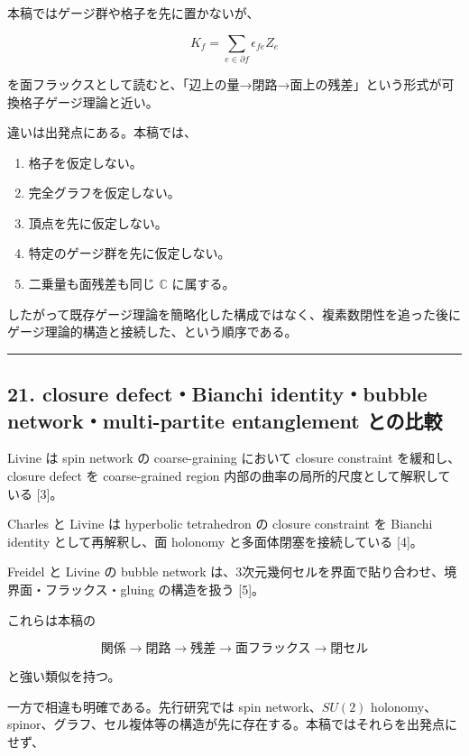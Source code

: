 \documentclass[
  a4paper,
]{ltjsarticle}
\providecommand{\tightlist}{%
  \setlength{\itemsep}{0pt}\setlength{\parskip}{0pt}}
\begin{document}
本稿ではゲージ群や格子を先に置かないが、

\[
K_f=\sum_{e\in\partial f}\epsilon_{fe}Z_e
\]

を面フラックスとして読むと、「辺上の量→閉路→面上の残差」という形式が可換格子ゲージ理論と近い。

違いは出発点にある。本稿では、

\begin{enumerate}
\def\labelenumi{\arabic{enumi}.}
\tightlist
\item
  格子を仮定しない。
\item
  完全グラフを仮定しない。
\item
  頂点を先に仮定しない。
\item
  特定のゲージ群を先に仮定しない。
\item
  二乗量も面残差も同じ \(\mathbb C\) に属する。
\end{enumerate}

したがって既存ゲージ理論を簡略化した構成ではなく、複素数閉性を追った後にゲージ理論的構造と接続した、という順序である。

\begin{center}\rule{0.5\linewidth}{0.5pt}\end{center}

\subsection{21. closure defect・Bianchi identity・bubble
network・multi-partite entanglement
との比較}\label{closure-defectbianchi-identitybubble-networkmulti-partite-entanglement-ux3068ux306eux6bd4ux8f03}

Livine は spin network の coarse-graining において closure constraint
を緩和し、closure defect を coarse-grained region
内部の曲率の局所的尺度として解釈している {[}3{]}。

Charles と Livine は hyperbolic tetrahedron の closure constraint を
Bianchi identity として再解釈し、面 holonomy と多面体閉塞を接続している
{[}4{]}。

Freidel と Livine の bubble network
は、3次元幾何セルを界面で貼り合わせ、境界面・フラックス・gluing
の構造を扱う {[}5{]}。

これらは本稿の

\[
\text{関係}\to\text{閉路}\to\text{残差}\to\text{面フラックス}\to\text{閉セル}
\]

と強い類似を持つ。

一方で相違も明確である。先行研究では spin network、\(SU(2)\)
holonomy、spinor、グラフ、セル複体等の構造が先に存在する。本稿ではそれらを出発点にせず、
\end{document}
